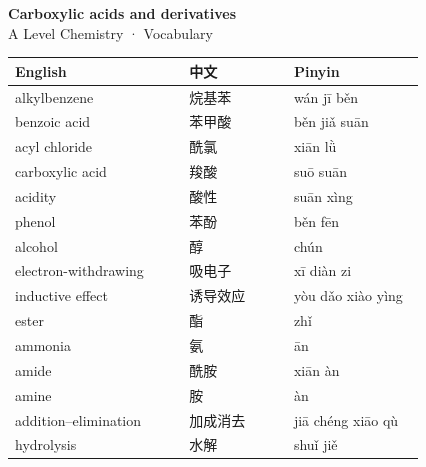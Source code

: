 \documentclass[11pt]{article}
\begin{document}
\begin{center}
  {\LARGE\bfseries Carboxylic acids and derivatives}\\[0.35em]
  {\large A Level Chemistry · Vocabulary}
\end{center}
\vspace{0.6em}

\begin{longtable}{@{}p{0.40\linewidth}p{0.24\linewidth}p{0.30\linewidth}@{}}
\toprule
\textbf{English} & \textbf{中文} & \textbf{Pinyin} \\
\midrule
\endhead
\bottomrule
\endlastfoot
alkylbenzene & 烷基苯 & wán jī běn \\
benzoic acid & 苯甲酸 & běn jiǎ suān \\
acyl chloride & 酰氯 & xiān lǜ \\
carboxylic acid & 羧酸 & suō suān \\
acidity & 酸性 & suān xìng \\
phenol & 苯酚 & běn fēn \\
alcohol & 醇 & chún \\
electron-withdrawing & 吸电子 & xī diàn zi \\
inductive effect & 诱导效应 & yòu dǎo xiào yìng \\
ester & 酯 & zhǐ \\
ammonia & 氨 & ān \\
amide & 酰胺 & xiān àn \\
amine & 胺 & àn \\
addition–elimination & 加成消去 & jiā chéng xiāo qù \\
hydrolysis & 水解 & shuǐ jiě \\
\end{longtable}
\end{document}

